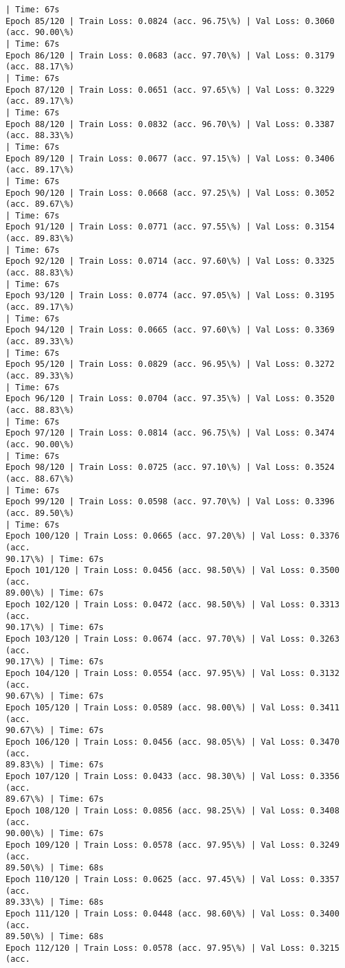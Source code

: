 \documentclass[8pt]{extarticle}
\begin{document}
\begin{Verbatim}[commandchars=\\\{\}]
| Time: 67s
Epoch 85/120 | Train Loss: 0.0824 (acc. 96.75\%) | Val Loss: 0.3060 (acc. 90.00\%)
| Time: 67s
Epoch 86/120 | Train Loss: 0.0683 (acc. 97.70\%) | Val Loss: 0.3179 (acc. 88.17\%)
| Time: 67s
Epoch 87/120 | Train Loss: 0.0651 (acc. 97.65\%) | Val Loss: 0.3229 (acc. 89.17\%)
| Time: 67s
Epoch 88/120 | Train Loss: 0.0832 (acc. 96.70\%) | Val Loss: 0.3387 (acc. 88.33\%)
| Time: 67s
Epoch 89/120 | Train Loss: 0.0677 (acc. 97.15\%) | Val Loss: 0.3406 (acc. 89.17\%)
| Time: 67s
Epoch 90/120 | Train Loss: 0.0668 (acc. 97.25\%) | Val Loss: 0.3052 (acc. 89.67\%)
| Time: 67s
Epoch 91/120 | Train Loss: 0.0771 (acc. 97.55\%) | Val Loss: 0.3154 (acc. 89.83\%)
| Time: 67s
Epoch 92/120 | Train Loss: 0.0714 (acc. 97.60\%) | Val Loss: 0.3325 (acc. 88.83\%)
| Time: 67s
Epoch 93/120 | Train Loss: 0.0774 (acc. 97.05\%) | Val Loss: 0.3195 (acc. 89.17\%)
| Time: 67s
Epoch 94/120 | Train Loss: 0.0665 (acc. 97.60\%) | Val Loss: 0.3369 (acc. 89.33\%)
| Time: 67s
Epoch 95/120 | Train Loss: 0.0829 (acc. 96.95\%) | Val Loss: 0.3272 (acc. 89.33\%)
| Time: 67s
Epoch 96/120 | Train Loss: 0.0704 (acc. 97.35\%) | Val Loss: 0.3520 (acc. 88.83\%)
| Time: 67s
Epoch 97/120 | Train Loss: 0.0814 (acc. 96.75\%) | Val Loss: 0.3474 (acc. 90.00\%)
| Time: 67s
Epoch 98/120 | Train Loss: 0.0725 (acc. 97.10\%) | Val Loss: 0.3524 (acc. 88.67\%)
| Time: 67s
Epoch 99/120 | Train Loss: 0.0598 (acc. 97.70\%) | Val Loss: 0.3396 (acc. 89.50\%)
| Time: 67s
Epoch 100/120 | Train Loss: 0.0665 (acc. 97.20\%) | Val Loss: 0.3376 (acc.
90.17\%) | Time: 67s
Epoch 101/120 | Train Loss: 0.0456 (acc. 98.50\%) | Val Loss: 0.3500 (acc.
89.00\%) | Time: 67s
Epoch 102/120 | Train Loss: 0.0472 (acc. 98.50\%) | Val Loss: 0.3313 (acc.
90.17\%) | Time: 67s
Epoch 103/120 | Train Loss: 0.0674 (acc. 97.70\%) | Val Loss: 0.3263 (acc.
90.17\%) | Time: 67s
Epoch 104/120 | Train Loss: 0.0554 (acc. 97.95\%) | Val Loss: 0.3132 (acc.
90.67\%) | Time: 67s
Epoch 105/120 | Train Loss: 0.0589 (acc. 98.00\%) | Val Loss: 0.3411 (acc.
90.67\%) | Time: 67s
Epoch 106/120 | Train Loss: 0.0456 (acc. 98.05\%) | Val Loss: 0.3470 (acc.
89.83\%) | Time: 67s
Epoch 107/120 | Train Loss: 0.0433 (acc. 98.30\%) | Val Loss: 0.3356 (acc.
89.67\%) | Time: 67s
Epoch 108/120 | Train Loss: 0.0856 (acc. 98.25\%) | Val Loss: 0.3408 (acc.
90.00\%) | Time: 67s
Epoch 109/120 | Train Loss: 0.0578 (acc. 97.95\%) | Val Loss: 0.3249 (acc.
89.50\%) | Time: 68s
Epoch 110/120 | Train Loss: 0.0625 (acc. 97.45\%) | Val Loss: 0.3357 (acc.
89.33\%) | Time: 68s
Epoch 111/120 | Train Loss: 0.0448 (acc. 98.60\%) | Val Loss: 0.3400 (acc.
89.50\%) | Time: 68s
Epoch 112/120 | Train Loss: 0.0578 (acc. 97.95\%) | Val Loss: 0.3215 (acc.

\end{Verbatim}
\end{document}
